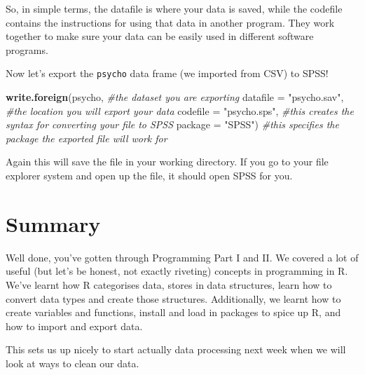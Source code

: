 \documentclass[
]{book}
\newenvironment{Shaded}{\begin{snugshade}}{\end{snugshade}}
\newcommand{\AttributeTok}[1]{\textcolor[rgb]{0.13,0.29,0.53}{#1}}
\newcommand{\CommentTok}[1]{\textcolor[rgb]{0.56,0.35,0.01}{\textit{#1}}}
\newcommand{\FunctionTok}[1]{\textcolor[rgb]{0.13,0.29,0.53}{\textbf{#1}}}
\newcommand{\NormalTok}[1]{#1}
\newcommand{\StringTok}[1]{\textcolor[rgb]{0.31,0.60,0.02}{#1}}
\begin{document}
So, in simple terms, the datafile is where your data is saved, while the codefile contains the instructions for using that data in another program. They work together to make sure your data can be easily used in different software programs.

Now let's export the \texttt{psycho} data frame (we imported from CSV) to SPSS!

\begin{Shaded}
\begin{Highlighting}[]
\FunctionTok{write.foreign}\NormalTok{(psycho, }\CommentTok{\#the dataset you are exporting}
              \AttributeTok{datafile =} \StringTok{"psycho.sav"}\NormalTok{, }\CommentTok{\#the location you will export your data}
              \AttributeTok{codefile =} \StringTok{"psycho.sps"}\NormalTok{, }\CommentTok{\#this creates the syntax for converting your file to SPSS}
              \AttributeTok{package =} \StringTok{"SPSS"}\NormalTok{) }\CommentTok{\#this specifies the package the exported file will work for}
\end{Highlighting}
\end{Shaded}

Again this will save the file in your working directory. If you go to your file explorer system and open up the file, it should open SPSS for you.

\hypertarget{summary-4}{%
\section{Summary}\label{summary-4}}

Well done, you've gotten through Programming Part I and II. We covered a lot of useful (but let's be honest, not exactly riveting) concepts in programming in R. We've learnt how R categorises data, stores in data structures, learn how to convert data types and create those structures. Additionally, we learnt how to create variables and functions, install and load in packages to spice up R, and how to import and export data.

This sets us up nicely to start actually data processing next week when we will look at ways to clean our data.

  
\end{document}
